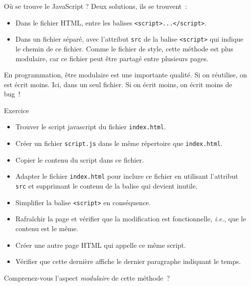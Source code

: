 \documentclass{beamer}
\begin{document}
    \begin{frame}{Où se trouve le JavaScript ?}
        Deux solutions, ils se trouvent~:
        \begin{itemize}
            \item Dans le fichier HTML, entre les balises \lstinline{<script>...</script>}.
            \item Dans un fichier séparé, avec l'attribut \lstinline{src} de la balise \lstinline{<script>} qui indique le chemin de ce fichier.
            Comme le fichier de style, cette méthode est plus modulaire, car ce fichier peut être partagé entre plusieurs pages.
        \end{itemize}
        \bigbreak
        \begin{dangercolorbox}
            En programmation, être modulaire est une importante qualité. Si on réutilise, on est écrit moins.
            Ici, dans un seul fichier.
            Si on écrit moins, on écrit moins de bug~!
        \end{dangercolorbox}
    \end{frame}

    \begin{frame}{Exercice \execcounterdispinc{}}
        \begin{itemize}
            \item Trouver le script javascript du fichier \lstinline{index.html}.
            \item Créer un fichier \lstinline{script.js} dans le même répertoire que \lstinline{index.html}.
            \item Copier le contenu du script dans ce fichier.
            \item Adapter le fichier \lstinline{index.html} pour inclure ce fichier en utilisant l'attribut \lstinline{src} et supprimant le contenu de la balise qui devient inutile.
            \item Simplifier la balise \lstinline{<script>} en conséquence.
            \item Rafraîchir la page et vérifier que la modification est fonctionnelle, \textit{i.e.}, que le contenu est le même.
            \item Créer une autre page HTML qui appelle ce même script.
            \item Vérifier que cette dernière affiche le dernier paragraphe indiquant le temps.
        \end{itemize}
        Comprenez-vous l'aspect \textit{modulaire} de cette méthode~?
    \end{frame}
\end{document}
